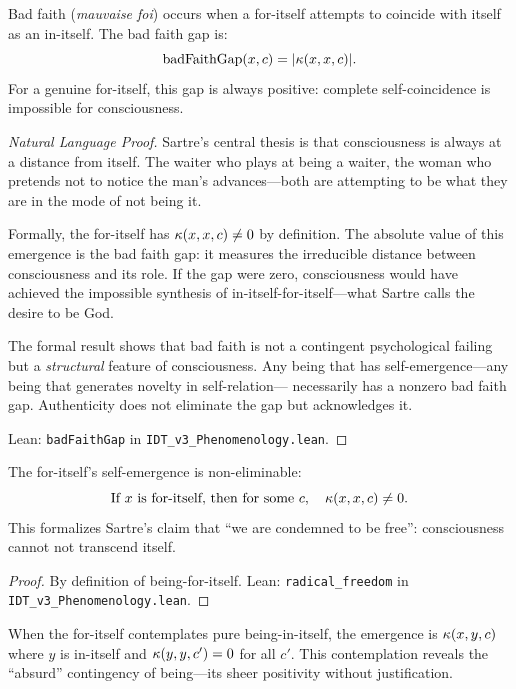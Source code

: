 \begin{theorem}
\label{thm:bad-faith-gap}
Bad faith (\textit{mauvaise foi}) occurs when a for-itself attempts to coincide
with itself as an in-itself.  The bad faith gap is:
\[
\mathrm{badFaithGap}(x, c) = |\kappa(x, x, c)|.
\]
For a genuine for-itself, this gap is always positive: complete self-coincidence
is impossible for consciousness.
\end{theorem}

\begin{proof}[Natural Language Proof]
Sartre's central thesis is that consciousness is always at a distance from
itself.  The waiter who plays at being a waiter, the woman who pretends not
to notice the man's advances---both are attempting to be what they are in the
mode of not being it.

Formally, the for-itself has $\kappa(x, x, c) \neq 0$ by definition.
The absolute value of this emergence is the bad faith gap: it measures the
irreducible distance between consciousness and its role.  If the gap were
zero, consciousness would have achieved the impossible synthesis of
in-itself-for-itself---what Sartre calls the desire to be God.

The formal result shows that bad faith is not a contingent psychological
failing but a \emph{structural} feature of consciousness.  Any being that
has self-emergence---any being that generates novelty in self-relation---
necessarily has a nonzero bad faith gap.  Authenticity does not eliminate
the gap but acknowledges it.

Lean: \texttt{badFaithGap} in \texttt{IDT\_v3\_Phenomenology.lean}.
\end{proof}

\begin{theorem}
\label{thm:radical-freedom}
The for-itself's self-emergence is non-eliminable:
\[
\text{If } x \text{ is for-itself, then for some } c, \quad
\kappa(x, x, c) \neq 0.
\]
This formalizes Sartre's claim that ``we are condemned to be free'': consciousness
cannot not transcend itself.
\end{theorem}

\begin{proof}
By definition of being-for-itself.
Lean: \texttt{radical\_freedom} in \texttt{IDT\_v3\_Phenomenology.lean}.
\end{proof}

\begin{theorem}
\label{thm:nausea}
When the for-itself contemplates pure being-in-itself, the emergence is
$\kappa(x, y, c)$ where $y$ is in-itself and $\kappa(y, y, c') = 0$ for all
$c'$.  This contemplation reveals the ``absurd'' contingency of being---its
sheer positivity without justification.
\end{theorem}

